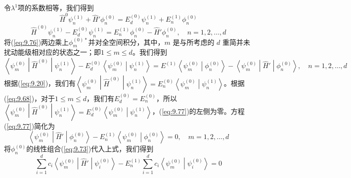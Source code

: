     令$\lambda^1$项的系数相等，我们得到
    \begin{equation*}
        \hat{H}^0\psi_n^{\left(1\right)} + \hat{H}'\phi_n^{\left(0\right)} = E_d^{\left(0\right)}\psi_n^{\left(1\right)} + E_n^{\left(1\right)}\phi_n^{\left(0\right)}
    \end{equation*}
    \begin{equation}
        \hat{H}^{\left(0\right)}\psi_n^{\left(1\right)} - E_d^{\left(0\right)}\psi_n^{\left(1\right)} = E_n^{\left(1\right)}\phi_n^{\left(0\right)} - \hat{H}'\phi_n^{\left(0\right)}, \quad n = 1,2,\ldots,d
        \label{eq:9.76}
    \end{equation}
    将(\ref{eq:9.76})两边乘上$\phi_m^{\left(0\right)*}$并对全空间积分，其中，$m$ 是与所考虑的 $d$ 重简并未扰动能级相对应的状态之一；即$1 \leq m \leq d$。我们得到
    \begin{equation}
        \left\langle \psi_m^{\left(0\right)} \middle| \hat{H}^{\left(0\right)} \middle| \psi_n^{\left(1\right)} \right\rangle - E_d^{\left(0\right)} \left\langle \psi_m^{\left(0\right)} \middle| \psi_n^{\left(1\right)} \right\rangle = E^{\left(1\right)}\left\langle \psi_m^{\left(0\right)} \middle| \phi_n^{\left(0\right)} \right\rangle - \left\langle \psi_m^{\left(0\right)} \middle| \hat{H}' \middle| \phi_n^{\left(0\right)} \right\rangle, \quad n = 1,2,\ldots,d
        \label{eq:9.77}
    \end{equation}
    根据(\ref{eq:9.20})，我们有$\left\langle \psi_m^{\left(0\right)} \middle| \hat{H}^{\left(0\right)} \middle| \psi_n^{\left(1\right)} \right\rangle = E_n^{\left(0\right)}\left\langle \psi_m^{\left(0\right)} \middle| \psi_n^{\left(1\right)} \right\rangle$。根据(\ref{eq:9.68})，对于$1 \leq m \leq d$，我们有$E_d^{\left(0\right)} = E_n^{\left(0\right)}$，所以$\left\langle \psi_m^{\left(0\right)} \middle| \hat{H}^{\left(0\right)} \middle| \psi_n^{\left(1\right)} \right\rangle = E_d^{\left(0\right)}\left\langle \psi_m^{\left(0\right)} \middle| \psi_n^{\left(1\right)} \right\rangle$，(\ref{eq:9.77})的左侧为零。方程(\ref{eq:9.77})简化为
    \begin{equation*}
        \left\langle \psi_m^{\left(0\right)} \middle| \hat{H}' \middle| \phi_n^{\left(0\right)} \right\rangle - E_n^{\left(1\right)} \left\langle \psi_m^{\left(0\right)} \middle| \phi_n^{\left(0\right)} \right\rangle = 0, \quad m = 1,2,\ldots,d
    \end{equation*}
    将$\phi_n^{\left(0\right)}$的线性组合(\ref{eq:9.73})代入上式，我们得到
    \begin{equation}
        \sum_{i=1}^{d}c_i\left\langle \psi_m^{\left(0\right)} \middle| \hat{H}' \middle| \psi_i^{\left(0\right)} \right\rangle - E_n^{\left(1\right)} \sum_{i=1}^{d}c_i\left\langle \psi_m^{\left(0\right)} \middle| \psi_i^{\left(0\right)} \right\rangle = 0
        \label{eq:9.78}
    \end{equation}
